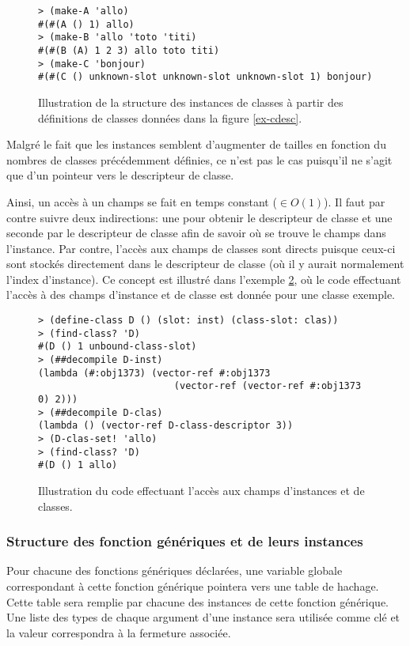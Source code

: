       \begin{figure}[h!]
        \begin{lstlisting}
> (make-A 'allo)
#(#(A () 1) allo)
> (make-B 'allo 'toto 'titi)
#(#(B (A) 1 2 3) allo toto titi)
> (make-C 'bonjour)
#(#(C () unknown-slot unknown-slot unknown-slot 1) bonjour)
        \end{lstlisting}
        \caption{Illustration de la structure des instances de classes à
          partir des définitions de classes données dans la figure
          \ref{ex-cdesc}.}
        \label{ex-struct-inst}
      \end{figure}

      Malgré le fait que les instances semblent d'augmenter de tailles
      en fonction du nombres de classes précédemment définies, ce n'est
      pas le cas puisqu'il ne s'agit que d'un pointeur vers le
      descripteur de classe.

      Ainsi, un accès à un champs se fait en temps constant ($\in
      O(1)$). Il faut par contre suivre deux indirections: une pour
      obtenir le descripteur de classe et une seconde par le
      descripteur de classe afin de savoir où se trouve le champs dans
      l'instance. Par contre, l'accès aux champs de classes sont
      directs puisque ceux-ci sont stockés directement dans le
      descripteur de classe (où il y aurait normalement l'index
      d'instance). Ce concept est illustré dans l'exemple
      \ref{ex-slot-access}, où le code effectuant l'accès à des champs
      d'instance et de classe est donnée pour une classe exemple.

      \begin{figure}[h!]
        \begin{lstlisting}
> (define-class D () (slot: inst) (class-slot: clas))
> (find-class? 'D)
#(D () 1 unbound-class-slot)
> (##decompile D-inst)
(lambda (#:obj1373) (vector-ref #:obj1373 
                        (vector-ref (vector-ref #:obj1373 0) 2)))
> (##decompile D-clas)
(lambda () (vector-ref D-class-descriptor 3))
> (D-clas-set! 'allo)
> (find-class? 'D)
#(D () 1 allo)
        \end{lstlisting}
        \caption{Illustration du code effectuant l'accès aux champs
          d'instances et de classes.}
        \label{ex-slot-access}
      \end{figure}

    \subsubsection{Structure des fonction génériques et de leurs instances}
      \label{genfun-struct}
      Pour chacune des fonctions génériques déclarées, une variable
      globale correspondant à cette fonction générique pointera vers
      une table de hachage. Cette table sera remplie par chacune des
      instances de cette fonction générique. Une liste des types de
      chaque argument d'une instance sera utilisée comme clé et la
      valeur correspondra à la fermeture associée.

